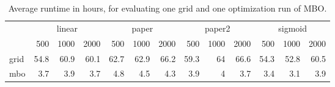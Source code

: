 \begin{table}

\caption{\label{tab:}Average runtime in hours, for evaluating one grid and one optimization run of MBO.}
\centering
\begin{tabular}[t]{lrrrrrrrrrrrr}
\toprule
\multicolumn{1}{c}{ } & \multicolumn{3}{c}{linear} & \multicolumn{3}{c}{paper} & \multicolumn{3}{c}{paper2} & \multicolumn{3}{c}{sigmoid} \\
\cmidrule(l{3pt}r{3pt}){2-4} \cmidrule(l{3pt}r{3pt}){5-7} \cmidrule(l{3pt}r{3pt}){8-10} \cmidrule(l{3pt}r{3pt}){11-13}
 & 500 & 1000 & 2000 & 500 & 1000 & 2000 & 500 & 1000 & 2000 & 500 & 1000 & 2000\\
\midrule
grid & 54.8 & 60.9 & 60.1 & 62.7 & 62.9 & 66.2 & 59.3 & 64 & 66.6 & 54.3 & 52.8 & 60.5\\
mbo & 3.7 & 3.9 & 3.7 & 4.8 & 4.5 & 4.3 & 3.9 & 4 & 3.7 & 3.4 & 3.1 & 3.9\\
\bottomrule
\end{tabular}
\end{table}
